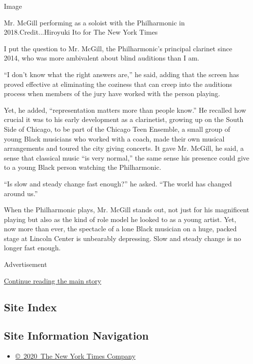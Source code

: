 Image

Mr. McGill performing as a soloist with the Philharmonic in
2018.Credit...Hiroyuki Ito for The New York Times

I put the question to Mr. McGill, the Philharmonic's principal clarinet
since 2014, who was more ambivalent about blind auditions than I am.

``I don't know what the right answers are,'' he said, adding that the
screen has proved effective at eliminating the coziness that can creep
into the auditions process when members of the jury have worked with the
person playing.

Yet, he added, ``representation matters more than people know.'' He
recalled how crucial it was to his early development as a clarinetist,
growing up on the South Side of Chicago, to be part of the Chicago Teen
Ensemble, a small group of young Black musicians who worked with a
coach, made their own musical arrangements and toured the city giving
concerts. It gave Mr. McGill, he said, a sense that classical music ``is
very normal,'' the same sense his presence could give to a young Black
person watching the Philharmonic.

``Is slow and steady change fast enough?'' he asked. ``The world has
changed around us.''

When the Philharmonic plays, Mr. McGill stands out, not just for his
magnificent playing but also as the kind of role model he looked to as a
young artist. Yet, now more than ever, the spectacle of a lone Black
musician on a huge, packed stage at Lincoln Center is unbearably
depressing. Slow and steady change is no longer fast enough.

Advertisement

\protect\hyperlink{after-bottom}{Continue reading the main story}

\hypertarget{site-index}{%
\subsection{Site Index}\label{site-index}}

\hypertarget{site-information-navigation}{%
\subsection{Site Information
Navigation}\label{site-information-navigation}}

\begin{itemize}
\tightlist
\item
  \href{https://help.nytimes.com/hc/en-us/articles/115014792127-Copyright-notice}{©~2020~The
  New York Times Company}
\end{itemize}

